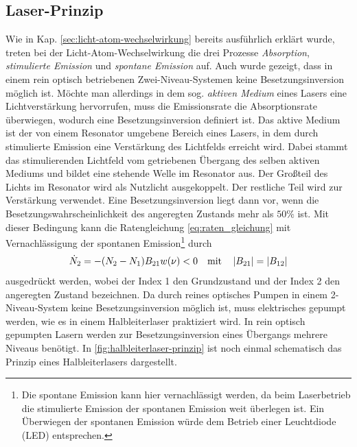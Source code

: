 \subsection{Laser-Prinzip}\label{subsec:laser-prinzip}
Wie in Kap. \ref{sec:licht-atom-wechselwirkung} bereits ausführlich erklärt
wurde, treten bei der Licht-Atom-Wechselwirkung die drei Prozesse
\textit{Absorption}, \textit{stimulierte Emission} und \textit{spontane Emission} auf. Auch wurde
gezeigt, dass in einem rein optisch betriebenen Zwei-Niveau-Systemen keine
Besetzungsinversion möglich ist.
Möchte man allerdings in dem sog. \textit{aktiven Medium} eines Lasers eine Lichtverstärkung
hervorrufen, muss die Emissionsrate die Absorptionsrate überwiegen, wodurch eine
Besetzungsinversion definiert ist. Das aktive Medium ist der von einem Resonator
umgebene Bereich eines Lasers, in dem durch stimulierte Emission eine
Verstärkung des Lichtfelds erreicht wird. Dabei stammt das stimulierenden
Lichtfeld vom getriebenen Übergang des selben aktiven Mediums und bildet eine
stehende Welle im Resonator aus. Der Großteil des Lichts im Resonator wird als
Nutzlicht ausgekoppelt. Der restliche Teil wird zur Verstärkung verwendet. Eine
Besetzungsinversion liegt dann vor, wenn die Besetzungswahrscheinlichkeit des
angeregten Zustands mehr als $50\%$ ist.
Mit dieser Bedingung kann die Ratengleichung \eqref{eq:raten_gleichung} mit
Vernachlässigung der spontanen Emission\footnote{Die spontane Emission kann
hier vernachlässigt werden, da beim Laserbetrieb die stimulierte Emission der
spontanen Emission weit überlegen ist. Ein Überwiegen der spontanen Emission
würde dem Betrieb einer Leuchtdiode (LED) entsprechen.} durch
\begin{equation}\label{eq:laserbedingung}
	\dot N_2=-(N_2-N_1)B_{21}w(\nu)<0
	\quad\text{mit}\quad
	\left|B_{21}\right|=\left|B_{12}\right|
\end{equation}
ausgedrückt werden, wobei der Index 1 den Grundzustand und der Index 2 den
angeregten Zustand bezeichnen. Da durch reines optisches Pumpen in einem
2-Niveau-System keine Besetzungsinversion möglich ist, muss elektrisches gepumpt
werden, wie es in einem Halbleiterlaser praktiziert wird. In rein optisch
gepumpten Lasern werden zur Besetzungsinversion eines Übergangs mehrere
Niveaus benötigt. In \ref{fig:halbleiterlaser-prinzip} ist noch einmal
schematisch das Prinzip eines Halbleiterlasers dargestellt.
